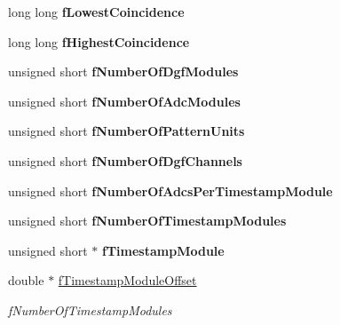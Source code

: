 \begin{DoxyCompactItemize}
long long {\bfseries f\+Lowest\+Coincidence}
\item 
\mbox{\label{class_global_settings_a8038987280b1ee7f8d4244c9f5c69020}} 
long long {\bfseries f\+Highest\+Coincidence}
\item 
\mbox{\label{class_global_settings_a88d5191ef09e0c4889aaac6ce4f2efce}} 
unsigned short {\bfseries f\+Number\+Of\+Dgf\+Modules}
\item 
\mbox{\label{class_global_settings_af5fac6b4659c9023f6bf3cdfb9d79b44}} 
unsigned short {\bfseries f\+Number\+Of\+Adc\+Modules}
\item 
\mbox{\label{class_global_settings_a6d3aad60ff241be473e4fef0eb9575fd}} 
unsigned short {\bfseries f\+Number\+Of\+Pattern\+Units}
\item 
\mbox{\label{class_global_settings_a19360b8664f3baa1adcf6b8252f45d35}} 
unsigned short {\bfseries f\+Number\+Of\+Dgf\+Channels}
\item 
\mbox{\label{class_global_settings_ae3d4548748ddb92df4cdb1690a99cb34}} 
unsigned short {\bfseries f\+Number\+Of\+Adcs\+Per\+Timestamp\+Module}
\item 
\mbox{\label{class_global_settings_af1c870cfde3e88bf42fb5db20301863a}} 
unsigned short {\bfseries f\+Number\+Of\+Timestamp\+Modules}
\item 
\mbox{\label{class_global_settings_a70bc89b24c2c6b9cc95090efd2c71c2e}} 
unsigned short $\ast$ {\bfseries f\+Timestamp\+Module}
\item 
\mbox{\label{class_global_settings_a97d325770bf95368ee70d0e336032cc6}} 
double $\ast$ \hyperlink{class_global_settings_a97d325770bf95368ee70d0e336032cc6}{f\+Timestamp\+Module\+Offset}
\begin{DoxyCompactList}\small\item\em f\+Number\+Of\+Timestamp\+Modules \end{DoxyCompactList}\item 
\mbox{\label{class_global_settings_abc63389c34c21eba6a25723442e825a2}} 

\end{DoxyCompactItemize}
